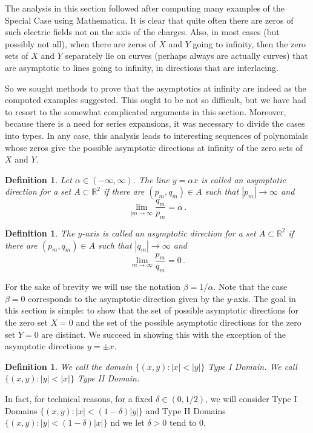 \documentclass{article}
\newtheorem{defn}[thm]{\bf Definition}
\theoremstyle{remark}
\numberwithin{equation}{section}
\begin{document}
The analysis in this section followed after computing many examples of the Special Case using Mathematica.  It is clear that quite often there are zeros of such electric fields not on the axis of the charges.  Also, in most cases (but possibly not all), when there are zeros of $X$ and $Y$ going to infinity, then the zero sets of $X$ and $Y$ separately lie on curves (perhaps always are actually curves) that are asymptotic to lines going to infinity, in directions that are interlacing.  

So we sought methods to prove that the asymptotics at infinity are indeed as the computed examples suggested.  This ought to be not so difficult, but we have had to resort to the somewhat complicated arguments in this section.  Moreover, because there is a need for series expansions, it was necessary to divide the cases into types.  
In any case, this analysis leads to interesting sequences of polynomials whose zeros give the possible asymptotic directions at infinity of the zero sets of $X$ and $Y$.   

\begin{defn}\label{AD1} 
Let $\alpha \in (-\infty,\infty)$. The line $y = \alpha x$ is called an {\em asymptotic direction} for a set $A \subset {\mathbb R}^2$ 
if there are $(p_m,q_m) \in A$ such that $|p_m| \rightarrow \infty$ and 
$$\lim_{|m \rightarrow \infty}{\frac{q_m}{p_m}} = \alpha\,.$$
\end{defn}

\begin{defn}\label{ADy}
The $y$-axis is called an asymptotic direction for a set $A \subset {\mathbb R}^2$ 
if there are $(p_m,q_m) \in A$ such that $|q_m| \rightarrow \infty$ and 
$$\lim_{m \rightarrow \infty}{\frac{p_m}{q_m}} = 0\,.$$  
\end{defn}

For the sake of brevity we will use the notation $\beta = 1/\alpha$. Note that the case $\beta = 0$ corresponds to the asymptotic direction given by the $y$-axis.
The goal in this section is simple: to show that the set of possible asymptotic directions for the zero set $X=0$ and the set of the possible asymptotic directions 
for the zero set $Y=0$ are distinct. We succeed in showing this with the exception of the asymptotic directions $y = \pm x$.  

\begin{defn}\label{Types} We call the domain $\{(x,y):|x| < |y|\}$ Type I Domain. We call $\{(x,y):|y| < |x|\}$ Type II Domain. 
\end{defn}
In fact, for technical reasons, for a fixed $\delta \in (0,1/2)$, we will consider Type I Domains
$\{(x,y):|x| < (1-\delta)|y|\}$ and Type II Domains $\{(x,y):|y| < (1-\delta)|x|\}$ nd we let $\delta > 0$ tend to $0$. 
\end{document}
